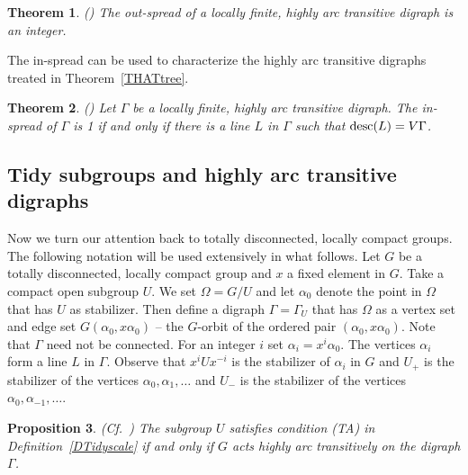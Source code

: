 \documentclass{emsprocart}
\newtheorem{theorem}{Theorem}[section]
\newtheorem{proposition}[theorem]{Proposition}
\theoremstyle{definition}
\begin{document}
\begin{theorem}{\rm (\cite[Theorem~2]{Moller2002a})}   The out-spread of
  a locally finite, highly arc transitive digraph is an integer.
\end{theorem}

The in-spread can be used to characterize the highly arc
transitive digraphs treated in Theorem~\ref{THATtree}.

\begin{theorem}{\rm (\cite[Theorem~2.6]{MMMSTZ2005})}   Let $\Gamma$ be a
  locally finite, highly arc transitive digraph.  The in-spread of
  $\Gamma$ is 1 if and only if there is a line $L$ in $\Gamma$ such
  that ${\mbox{${\rm desc}$}}(L)=V\Gamma$.
\end{theorem}

\subsection{Tidy subgroups and highly arc transitive digraphs}\label{STidy}
Now we turn our attention back to totally disconnected, locally compact
groups.  The following notation will be used extensively in what
follows.  Let $G$ be  a totally disconnected, locally compact
group and $x$ a fixed element in $G$.
Take a compact open sub\-group $U$.
We set $\Omega=G/U$ and let $\alpha_0$ denote the point
in $\Omega$ that has $U$ as stabilizer.  Then define a digraph
$\Gamma=\Gamma_U$ that has $\Omega$ as a vertex set and edge set
$G(\alpha_0, x\alpha_0)$ -- the $G$-orbit of the ordered pair
$(\alpha_0, x\alpha_0)$.   Note that $\Gamma$ need not be connected.
For an integer $i$ set
$\alpha_i=x^i\alpha_0$.  The vertices $\alpha_i$ form a line $L$ in
$\Gamma$.  Observe that $x^iUx^{-i}$ is the stabilizer of $\alpha_i$
in $G$ and $U_+$ is the stabilizer of the
vertices $\alpha_0, \alpha_1, \ldots$ and $U_-$ is the stabilizer
of the vertices $\alpha_0, \alpha_{-1}, \ldots$.

\begin{proposition}\label{PTAHAT}
{\rm (Cf.~\cite[Theorem~2.1]{Moller2002})}
The subgroup $U$ satisfies condition (TA) in Definition~\ref{DTidyscale}
if and only if $G$ acts highly arc transitively on the
digraph $\Gamma$.
\end{proposition}
\end{document}

